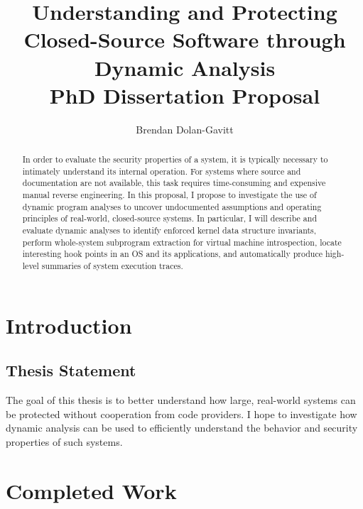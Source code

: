 \documentclass{article}
\title{Understanding and Protecting Closed-Source Software through Dynamic Analysis \\
\vspace {1em}
\large PhD Dissertation Proposal}
\author{Brendan Dolan-Gavitt}
\date{}
\begin{document}
\maketitle

\begin{abstract}

In order to evaluate the security properties of a system, it is
typically necessary to intimately understand its internal operation. For
systems where source and documentation are not available, this task
requires time-consuming and expensive manual reverse engineering. In
this proposal, I propose to investigate the use of dynamic program
analyses to uncover undocumented assumptions and operating principles of
real-world, closed-source systems. In particular, I will describe and
evaluate dynamic analyses to identify enforced kernel data structure
invariants, perform whole-system subprogram extraction for virtual
machine introspection, locate interesting hook points in an OS and its
applications, and automatically produce high-level summaries of system
execution traces.

\end{abstract}

\section {Introduction}



\subsection{Thesis Statement}

The goal of this thesis is to better understand how large, real-world
systems can be protected without cooperation from code providers. I hope
to investigate how dynamic analysis can be used to efficiently
understand the behavior and security properties of such systems.

\section {Completed Work}
\end{document}
